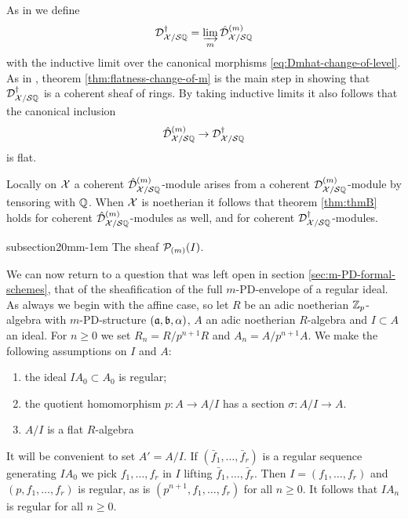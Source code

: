 \documentclass{article}
\makeatletter
\theoremstyle{change}
\renewcommand{\subsection}{\@startsection%
{subsection}{2}{0mm}{\baselineskip}{-1em}%
{\normalfont\normalsize\bfseries}}
\numberwithin{equation}{subsubsection}
\makeatother
\begin{document}
As in \cite[\S2.5]{berthelot:1996} we define
\begin{equation}
  \label{eq:Ddag}
  {\cal D}^\dagger_{{\cal X}/{\cal S}{\mathbb Q}}=\varinjlim_m{\hat{\cal D}}^{({m})}_{{\cal X}/{\cal S}{\mathbb Q}}
\end{equation}
with the inductive limit over the canonical morphisms
\ref{eq:Dmhat-change-of-level}. As in \cite[\S3.5]{berthelot:1996},
theorem \ref{thm:flatness-change-of-m} is the main step in showing
that ${\cal D}^\dagger_{{\cal X}/{\cal S}{\mathbb Q}}$ is a coherent sheaf of rings. By taking
inductive limits it also follows that the canonical inclusion
\begin{displaymath}
  {\hat{\cal D}}^{({m})}_{{\cal X}/{\cal S}{\mathbb Q}}\to{\cal D}^\dagger_{{\cal X}/{\cal S}{\mathbb Q}}
\end{displaymath}
is flat.

Locally on ${\cal X}$ a coherent ${\hat{\cal D}}^{({m})}_{{\cal X}/{\cal S}{\mathbb Q}}$-module arises
from a coherent ${{\cal D}}^{({m})}_{{\cal X}/{\cal S}{\mathbb Q}}$-module by tensoring with
${\mathbb Q}$. When ${\cal X}$ is noetherian it follows that theorem \ref{thm:thmB}
holds for coherent ${\hat{\cal D}}^{({m})}_{{\cal X}/{\cal S}{\mathbb Q}}$-modules as well, and
for coherent ${\cal D}^\dagger_{{\cal X}/{\cal S}{\mathbb Q}}$-modules. 

\subsection{The sheaf ${\cal P}_{(m)}(I)$.}
\label{sec:P_m(I)}

We can now return to a question that was left open in section
\ref{sec:m-PD-formal-schemes}, that of the sheafification of the full
$m$-PD-envelope of a regular ideal. As always we begin with the
affine case, so let $R$ be an adic noetherian ${\mathbb Z}_p$-algebra with
$m$-PD-structure $({\mathfrak a},{\mathfrak b},\alpha)$, $A$ an adic noetherian
$R$-algebra and $I\subset A$ an ideal. For $n\ge0$ we set
$R_n=R/p^{n+1}R$ and $A_n=A/p^{n+1}A$.  We make the following
assumptions on $I$ and $A$:
\begin{enumerate}
\item the ideal $IA_0\subset A_0$ is regular;
\item the quotient homomorphism $p:A\to A/I$ has a section
  $\sigma:A/I\to A$.
\item $A/I$ is a flat $R$-algebra
\end{enumerate}
It will be convenient to set $A'=A/I$.
If $(\bar f_1,\ldots,\bar f_r)$ is a regular sequence generating
$IA_0$ we pick $f_1,\ldots,f_r$ in $I$ lifting
$\bar f_1,\ldots,\bar f_r$. Then $I=(f_1,\ldots,f_r)$ and
$(p,f_1,\ldots,f_r)$ is regular, as is $(p^{n+1},f_1,\ldots,f_r)$ for
all $n\ge0$. It follows that $IA_n$ is regular for all $n\ge0$.
\end{document}
